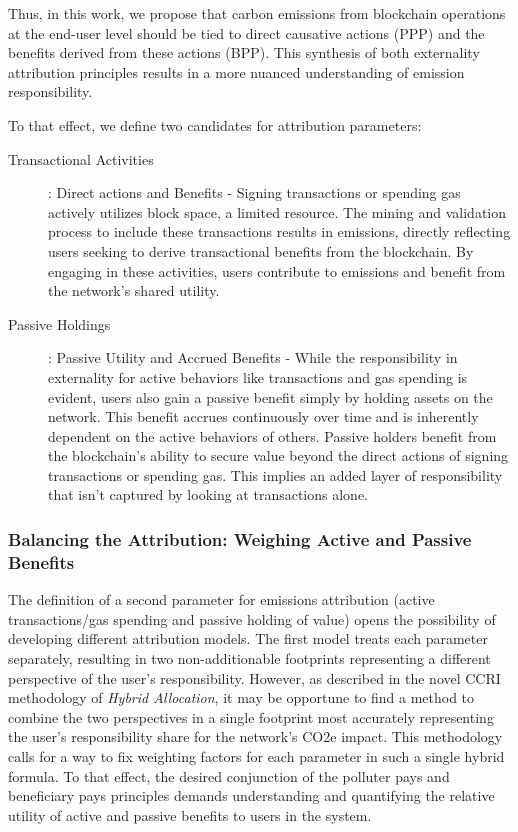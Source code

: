 \documentclass[11pt]{report}
\begin{document}
Thus, in this work, we propose that carbon emissions from blockchain operations at the end-user level should be tied to direct causative actions (\ac{PPP}) and the benefits derived from these actions (\ac{BPP}). This synthesis of both externality attribution principles results in a more nuanced understanding of emission responsibility.

To that effect, we define two candidates for attribution parameters:

\begin{description}
    \item [Transactional Activities]: Direct actions and Benefits - Signing transactions or spending gas actively utilizes block space, a limited resource. The mining and validation process to include these transactions results in emissions, directly reflecting users seeking to derive transactional benefits from the blockchain. By engaging in these activities, users contribute to emissions and benefit from the network's shared utility.
    \item [Passive Holdings]: Passive Utility and Accrued Benefits - While the responsibility in externality for active behaviors like transactions and gas spending is evident, users also gain a passive benefit simply by holding assets on the network. This benefit accrues continuously over time and is inherently dependent on the active behaviors of others. Passive holders benefit from the blockchain's ability to secure value beyond the direct actions of signing transactions or spending gas. This implies an added layer of responsibility that isn't captured by looking at transactions alone.

\end{description}

\subsubsection*{Balancing the Attribution: Weighing Active and Passive Benefits}
The definition of a second parameter for emissions attribution (active transactions/gas spending and passive holding of value) opens the possibility of developing different attribution models. The first model treats each parameter separately, resulting in two non-additionable footprints representing a different perspective of the user's responsibility. However, as described in the novel CCRI methodology of \textit{Hybrid Allocation}, it may be opportune to find a method to combine the two perspectives in a single footprint most accurately representing the user's responsibility share for the network's CO2e impact. This methodology calls for a way to fix weighting factors for each parameter in such a single hybrid formula. To that effect, the desired conjunction of the polluter pays and beneficiary pays principles demands understanding and quantifying the relative utility of active and passive benefits to users in the system.
\end{document}
